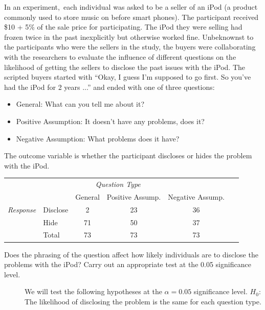 \begin{examplewrap}
\begin{nexample}{
 In an experiment,\footnotemark\, each individual was asked to be a seller of an iPod
  (a product commonly used to store music on before smart phones).
  The participant received \$10 + 5\% of the sale price for participating.
  The iPod they were selling had frozen twice in the past inexplicitly but
  otherwise worked fine. Unbeknownst to the participants who were the sellers
in the study,
the buyers were collaborating with the researchers
to evaluate the influence of different questions
on the likelihood of getting the sellers to disclose
the past issues with the iPod.
The scripted buyers started with
``Okay, I guess I'm supposed to go first.
  So you've had the iPod for 2 years ...''
and ended with one of three questions:
 \begin{itemize}\vspace{-2mm}
\setlength{\itemsep}{0mm}
    \item{General: What can you tell me about it?}
    \item{Positive Assumption: It doesn't have any problems, does it?}
    \item{Negative Assumption: What problems does it have?}
  \end{itemize}
The outcome variable is whether the participant discloses or hides the problem with the iPod.
\begin{center}
\begin{tabular}{l l c c c l}
								&			& \multicolumn{2}{c}{\textit{Question Type}}	& &\hspace{10mm}\ 		\\
\cline{3-5}
								&			& General		& Positive Assump.		& Negative Assump.	\\
\cline{2-5}
\textit{Response}								& Disclose		& 2		& 23		& 36	\\
					& Hide		& 71			& 50 			& 37	\\
\cline{2-5}
								& Total		& 73		& 73		& 73
\end{tabular}
\end{center}
 Does the phrasing of the question affect how likely individuals are to disclose the problems with the iPod?  Carry out an appropriate test at the 0.05 significance level.  }
\begin{description}
\item[] We will test the following hypotheses at the $\alpha=0.05$ significance level.
\newline $H_0$: The likelihood of disclosing the problem is the same for each question type.  

\end{description}
\end{nexample}
\end{examplewrap}
